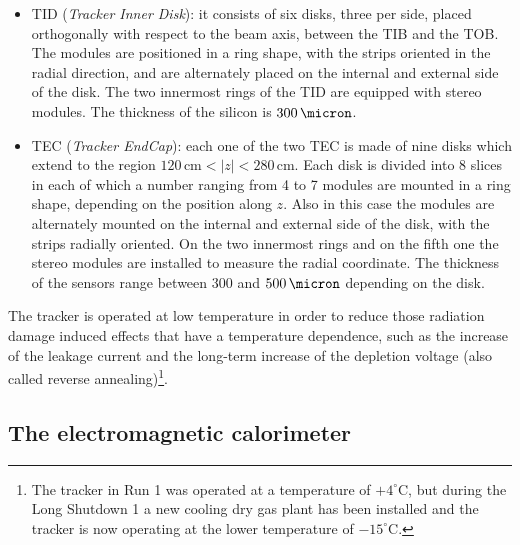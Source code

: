 \begin{itemize}
\item TID (\emph{Tracker Inner Disk}): it consists of six disks, three per side, placed orthogonally with respect to the beam axis, between the TIB and the TOB. The modules are positioned in a ring shape, with the strips oriented in the radial direction, and are alternately placed on the internal and external side of the disk. The two innermost rings of the TID are equipped with stereo modules. The thickness of the silicon is $300\,\micron$.
\item TEC (\emph{Tracker EndCap}): each one of the two TEC is made of nine disks which extend to the region $120\,\mathrm{cm} < |z| < 280\,\mathrm{cm}$. Each disk is divided into 8 slices in each of which a number ranging from 4 to 7 modules are mounted in a ring shape, depending on the position along $z$. Also in this case the modules are alternately mounted on the internal and external side of the disk, with the strips radially oriented. On the two innermost rings and on the fifth one the stereo modules are installed to measure the radial coordinate. The thickness of the sensors range between 300 and $500\,\micron$ depending on the disk.
\end{itemize}
The tracker is operated at low temperature in order to reduce those radiation damage induced effects that have a temperature dependence, such as the increase of the leakage current and the long-term increase of the depletion voltage (also called reverse annealing)\footnote{The tracker in Run 1 was operated at a temperature of $+4^{\circ}$C, but during the Long Shutdown 1 a new cooling dry gas plant has been installed and the tracker is now operating at the lower temperature of $-15^{\circ}$C.}.


\subsection{The electromagnetic calorimeter}

